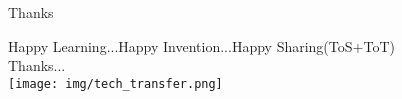 \begin{frame}{Thanks}
\begin{center}
	Happy Learning...Happy Invention...Happy Sharing(ToS+ToT)
	\\Thanks...\\
\texttt{[image: img/tech\_transfer.png]}
\end{center}
\end{frame}
